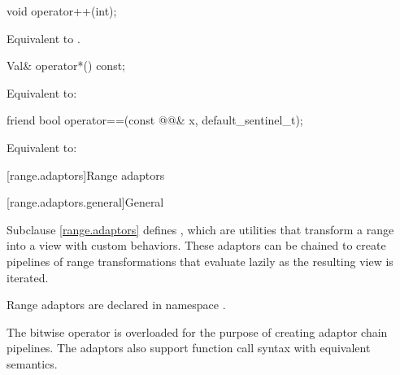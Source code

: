 %
\begin{itemdecl}
void operator++(int);
\end{itemdecl}

\begin{itemdescr}
\pnum
\effects
Equivalent to .
\end{itemdescr}

%
\begin{itemdecl}
Val& operator*() const;
\end{itemdecl}

\begin{itemdescr}
\pnum
\effects
Equivalent to: 
\end{itemdescr}

%
\begin{itemdecl}
friend bool operator==(const @@& x, default_sentinel_t);
\end{itemdecl}

\begin{itemdescr}
\pnum
\effects
Equivalent to: 
\end{itemdescr}

[range.adaptors]{Range adaptors}

[range.adaptors.general]{General}

\pnum
Subclause \ref{range.adaptors} defines , which are utilities that transform a
range into a view with custom behaviors. These
adaptors can be chained to create pipelines of range transformations that
evaluate lazily as the resulting view is iterated.

\pnum
Range adaptors are declared in namespace .

\pnum
The bitwise  operator is overloaded for the purpose of creating adaptor chain
pipelines. The adaptors also support function call syntax with equivalent
semantics.

\pnum
\begin{example}
\end{example}

